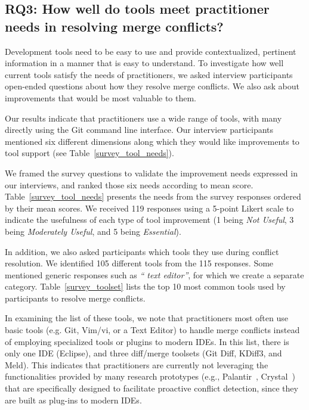 \subsection{\textbf{RQ3:} How well do tools meet practitioner needs in resolving merge conflicts?}\label{RQ3}
Development tools need to be easy to use and provide contextualized, pertinent information in a manner that is easy to understand.
To investigate how well current tools satisfy the needs of practitioners, we asked interview participants open-ended questions about how they resolve merge conflicts.
We also ask about improvements that would be most valuable to them. 

Our results indicate that practitioners use a wide range of tools, with many directly using the Git command line interface. Our interview participants mentioned six different dimensions along which they would like improvements to tool support (see Table~\ref{survey_tool_needs}). 

We framed the survey questions to validate the improvement needs expressed in our interviews, and ranked those six needs according to mean score.
Table~\ref{survey_tool_needs} presents the needs from the survey responses ordered by their mean scores.
We received 119 responses using a 5-point Likert scale to indicate the usefulness of each type of tool improvement (1 being \textit{Not Useful}, 3 being \textit{Moderately Useful}, and 5 being \textit{Essential}).

In addition, we also asked participants which tools they use during conflict resolution.
We identified 105 different tools from the 115 responses. Some mentioned generic responses such as \textit{`` text editor''}, for which we create a separate category.
Table~\ref{survey_toolset} lists the top 10 most common tools used by participants to resolve merge conflicts.

In examining the list of these tools, we note that practitioners most often use basic tools (e.g. Git, Vim/vi, or a Text Editor) to handle merge conflicts instead of employing specialized tools or plugins to modern IDEs. 
In this list, there is only one IDE (Eclipse), and three diff/merge toolsets (Git Diff, KDiff3, and Meld). 
This indicates that practitioners are currently not leveraging the functionalities provided by many research prototypes (e.g., Palantir~\cite{palantir}, Crystal~\cite{Brun2011}) that are specifically designed to facilitate proactive conflict detection, since they are built as plug-ins to modern IDEs. 

